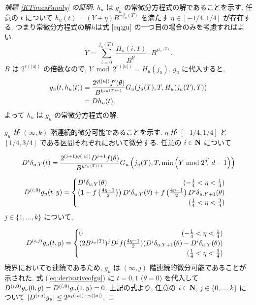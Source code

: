 \begin{proof}[\rm 補題 \ref{KTimesFamily} の証明]
 $h_u$ は $g_u$ の常微分方程式の解であることを示す.
 任意の $t$ について $h_u(t) = (Y + \eta) B^{-j_u(T)}$ を満たす 
 $\eta \in [-1/4, 1/4]$ が存在する. 
 つまり常微分方程式の解$h$は式 $\ref{eq:gu}$ の一つ目の場合のみを考慮すればよい.
 \begin{equation}
  Y = \sum_{i=0}^{j_u(T)} \frac{H_u(i, T)}{B^{k^i}} \cdot B^{k^{j_u(T)}}.
 \end{equation}
 $B$ は $2^{r(|u|)}$ の倍数なので,  $Y \bmod 2^{r(|u|)} = H_u(j_u)$. 
 $g_u$ に代入すると,
 \begin{align*}
   g_u(t, h_u(t)) 
  & =  \frac{2^{q(|u|)} f'(\theta)}{B^{k^{j_u(T)+1}}}
   G_u(j_u(T), T, H_u(j_u(T), T)) \\
  & =  D h_u(t).
 \end{align*}
 よって $h_u$ は $g_u$ の常微分方程式の解.

  $g_u$ が $(\infty, k)$ 階連続的微分可能であることを示す.
  $\eta$ が $[-1/4, 1/4]$ と $[1/4, 3/4]$ である区間それぞれにおいて微分する.
  任意の $i \in \mathbf N$ について

  \begin{equation}
   D^i \delta_{u,Y}(t) 
    = \frac{2^{(i+1)q(|u|)} D^{i+1}f(\theta)}{B^{k^{j_u(T)+1}}}
    G_u\left( j_u(T), T, \min \left(Y \bmod 2^{d'}\!\!\!,\ d-1 \right) \right)
  \end{equation}

  \begin{equation}
   \label{eq:derivativeofgu}
    \D^{(i,0)} g_u(t, y)
     = \begin{cases}
 	\D^i \delta_{u, Y}(\theta) 
	\hfill (- \frac 1 4 < \eta < \frac 1 4) \\
	\left( 1-f \left(\frac{4\eta-1}{2}\right)\right) 
	\D^i \delta_{u, Y}(\theta) 
	+ f \left(\frac{4\eta-1}{2}\right) \D^i \delta_{u,Y+1}(\theta) \\
	\hfill (\frac 1 4 < \eta < \frac 3 4)
       \end{cases}
  \end{equation}   
  $j \in \{1, \dots , k\}$ について,

  \begin{equation}
    \D^{(i,j)} g_u(t, y)
     = \begin{cases}
	0 \hfill (- \frac 1 4 < \eta < \frac 1 4) \\
	(2B^{j_u(T)})^j \D^j f(\frac{4\eta - 1}2)
	(\D^i \delta_{u,Y+1}(\theta)-\D^i \delta_{u, Y}(\theta)) \\
	\hfill (\frac 1 4 < \eta < \frac 3 4)
       \end{cases}
  \end{equation}
  境界においても連続であるため,
  $g_u$ は $(\infty, j)$ 階連続的微分可能であることが示された.
  式 (\ref{eq:derivativeofgu}) に $t = 0, 1$ ($\theta = 0$) を代入して
  $D^{(i, 0)} g_u(0,y) = D^{(i, 0)} g_u(1,y) = 0$.
  上記の式より, 任意の $i \in \mathbf N$, $j \in \{0, \dots, k\}$ について
  $|D^{(i,j)} g_u| \leq 2^{\mu_i (|u|) - \gamma(|u|)}$.


\end{proof}
